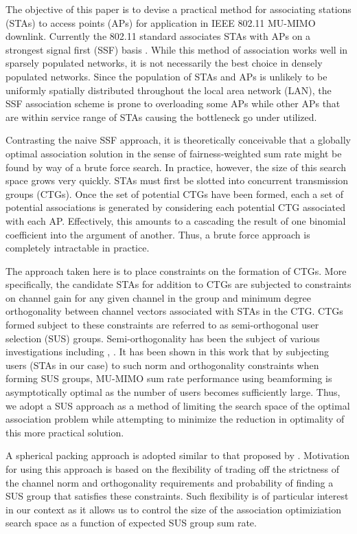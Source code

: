 The objective of this paper is to devise a practical method for associating stations (STAs) to access points (APs) for application in IEEE 802.11 MU-MIMO downlink. Currently the 802.11 standard associates STAs with APs on a strongest signal first (SSF) basis \cite{IEEE80211}. While this method of association works well in sparsely populated networks, it is not necessarily the best choice in densely populated networks. Since the population of STAs and APs is unlikely to be uniformly spatially distributed throughout the local area network (LAN), the SSF association scheme is prone to overloading some APs while other APs that are within service range of STAs causing the bottleneck go under utilized.

Contrasting the naive SSF approach, it is theoretically conceivable that a globally optimal association solution in the sense of fairness-weighted sum rate might be found by way of a brute force search. In practice, however, the size of this search space grows very quickly. STAs must first be slotted into concurrent transmission groups (CTGs). Once the set of potential CTGs have been formed, each a set of potential associations is generated by considering each potential CTG associated with each AP. Effectively, this amounts to a cascading the result of one binomial coefficient into the argument of another. Thus, a brute force approach is completely intractable in practice.

The approach taken here is to place constraints on the formation of CTGs. More specifically, the candidate STAs for addition to CTGs are subjected to constraints on channel gain for any given channel in the group and minimum degree orthogonality between channel vectors associated with STAs in the CTG. CTGs formed subject to these constraints are referred to as semi-orthogonal user selection (SUS) groups. Semi-orthogonality has been the subject of various investigations including \cite{Swannack2005}, \cite{Yoo2006}. It has been shown in this work that by subjecting users (STAs in our case) to such norm and orthogonality constraints when forming SUS groups, MU-MIMO sum rate performance using beamforming is asymptotically optimal as the number of users becomes sufficiently large. Thus, we adopt a SUS approach as a method of limiting the search space of the optimal association problem while attempting to minimize the reduction in optimality of this more practical solution.

A spherical packing approach is adopted similar to that proposed by \cite{Swannack2005}. Motivation for using this approach is based on the flexibility of trading off the strictness of the channel norm and orthogonality requirements and probability of finding a SUS group that satisfies these constraints. Such flexibility is of particular interest in our context as it allows us to control the size of the association optimiziation search space as a function of expected SUS group sum rate.

